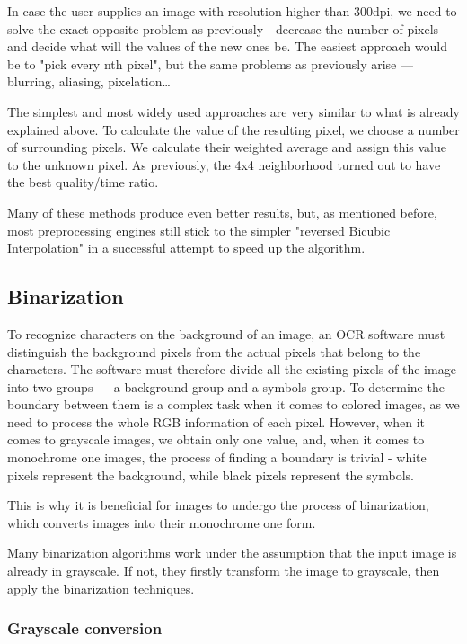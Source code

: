 In case the user supplies an image with resolution higher than 300dpi, we need to solve the exact opposite problem as previously - decrease the number of pixels and decide what will the values of the new ones be. The easiest approach would be to "pick every nth pixel", but the same problems as previously arise --- blurring, aliasing, pixelation\ldots

The simplest and most widely used approaches are very similar to what is already explained above. To calculate the value of the resulting pixel, we choose a number of surrounding pixels. We calculate their weighted average and assign this value to the unknown pixel. As previously, the 4x4 neighborhood turned out to have the best quality/time ratio.


Many of these methods produce even better results, but, as mentioned before, most preprocessing engines still stick to the simpler "reversed Bicubic Interpolation" in a successful attempt to speed up the algorithm.

\subsection{Binarization}

To recognize characters on the background of an image, an OCR software must distinguish the background pixels from the actual pixels that belong to the characters. The software must therefore divide all the existing pixels of the image into two groups --- a background group and a symbols group. To determine the boundary between them is a complex task when it comes to colored images, as we need to process the whole RGB information of each pixel. However, when it comes to grayscale images, we obtain only one value, and, when it comes to monochrome one images, the process of finding a boundary is trivial - white pixels represent the background, while black pixels represent the symbols.

This is why it is beneficial for images to undergo the process of binarization, which converts images into their monochrome one form.

Many binarization algorithms work under the assumption that the input image is already in grayscale. If not, they firstly transform the image to grayscale, then apply the binarization techniques.

\subsubsection{Grayscale conversion}

